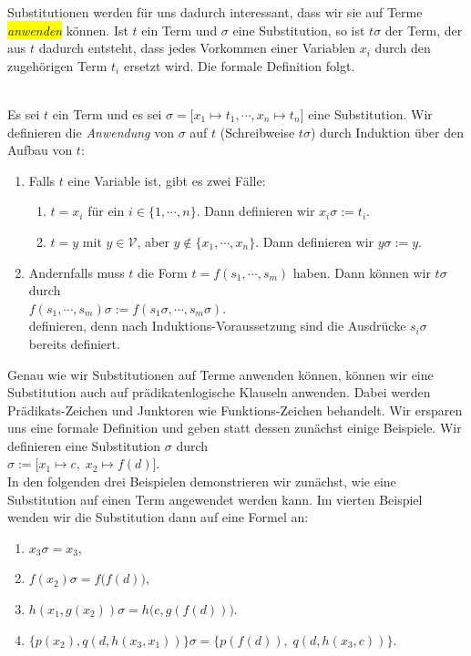 \noindent
Substitutionen werden f\"{u}r uns dadurch interessant, dass wir sie auf Terme \colorbox{yellow}{\emph{anwenden}}
k\"{o}nnen.  Ist $t$ ein Term und  
$\sigma$ eine Substitution, so ist $t\sigma$ der Term, der aus $t$ dadurch entsteht, dass jedes Vorkommen einer Variablen
$x_i$ durch den zugeh\"{o}rigen Term $t_i$ ersetzt wird.  Die formale Definition folgt. 
\begin{Definition}
\hspace*{\fill} \\
Es sei $t$ ein Term und es sei $\sigma = \bigl[ x_1 \mapsto t_1, \cdots, x_n \mapsto t_n \bigr]$
eine Substitution. Wir definieren die \emph{Anwendung} von $\sigma$ auf $t$ (Schreibweise $t\sigma$) durch Induktion \"{u}ber
den Aufbau von $t$: 
\begin{enumerate}
\item Falls $t$ eine Variable ist, gibt es zwei F\"{a}lle:
  \begin{enumerate}
  \item $t = x_i$ f\"{u}r ein $i\in\{1,\cdots,n\}$.  Dann definieren wir \quad  $x_i\sigma := t_i$.
  \item $t = y$ mit $y\in\mathcal{V}$, aber $y \not\in \{x_1,\cdots,x_n\}$. Dann definieren wir \quad $y\sigma := y$.
  \end{enumerate}
\item Andernfalls muss $t$ die Form $t= f(s_1,\cdots,s_m)$ haben. Dann k\"{o}nnen wir $t\sigma$ durch \\[0.2cm]
      \hspace*{1.3cm} $f(s_1, \cdots, s_m)\sigma := f(s_1\sigma, \cdots, s_m\sigma)$. \\[0.2cm]
      definieren, denn nach Induktions-Voraussetzung sind die Ausdr\"{u}cke $s_i\sigma$ bereits definiert.      
      \eox
\end{enumerate}
\end{Definition}

Genau wie wir Substitutionen auf Terme anwenden k\"{o}nnen, k\"{o}nnen wir eine Substitution
auch auf pr\"{a}dikatenlogische Klauseln anwenden.  Dabei werden Pr\"{a}dikats-Zeichen und
Junktoren wie Funktions-Zeichen behandelt.
Wir ersparen uns eine formale Definition und geben statt dessen zun\"{a}chst einige Beispiele. 
Wir definieren eine Substitution $\sigma$ durch \\[0.2cm]
\hspace*{1.3cm} $\sigma := \big[ x_1 \mapsto c,\; x_2 \mapsto f(d) \big]$. \\[0.2cm]
In den folgenden drei Beispielen demonstrieren wir zun\"{a}chst, wie eine Substitution
auf einen Term angewendet werden kann.  Im vierten Beispiel wenden wir die Substitution
dann auf eine Formel an:
\begin{enumerate}
\item $x_3\sigma = x_3$,
\item $f(x_2)\sigma = f\bigl(f(d)\bigr)$,
\item $h(x_1,g(x_2))\sigma = h\bigl(c,g(f(d))\bigr)$.
\item $\bigl\{ p(x_2), q(d,h(x_3,x_1))\bigr\}\sigma = \bigl\{ p(f(d)),\; q(d,h(x_3,c))\bigr\}$.
\end{enumerate}


